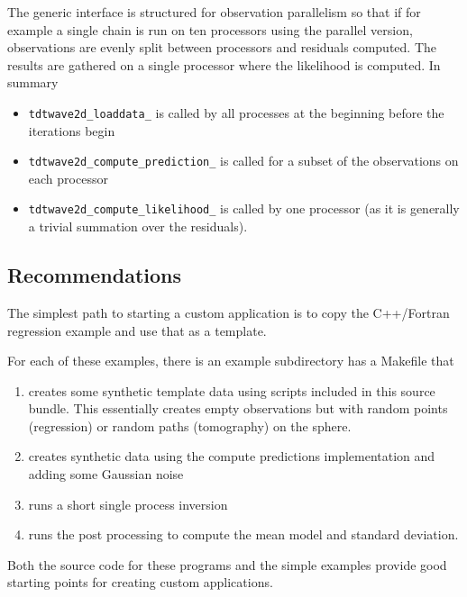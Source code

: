 \documentclass[a4paper,12pt]{article}
\begin{document}
The generic interface is structured for observation parallelism so that if for example
a single chain is run on ten processors using the parallel version, observations are
evenly split between processors and residuals computed. The results are gathered on
a single processor where the likelihood is computed. In summary

\begin{itemize}
\item {\tt tdtwave2d\_loaddata\_} is called by all processes at the beginning before
  the iterations begin
\item {\tt tdtwave2d\_compute\_prediction\_} is called for a subset of the observations
  on each processor
\item {\tt tdtwave2d\_compute\_likelihood\_} is called by one processor (as it is
  generally a trivial summation over the residuals).
\end{itemize}

\subsection{Recommendations}

The simplest path to starting a custom application is to copy 
the C++/Fortran regression example and use that as
a template.

For each of these examples, there is an example subdirectory
has a Makefile that

\begin{enumerate}
\item creates some synthetic template data using scripts included in this source
  bundle. This essentially creates empty observations but with random points (regression) or
  random paths (tomography) on the sphere.
\item creates synthetic data using the compute predictions implementation and adding
  some Gaussian noise
\item runs a short single process inversion
\item runs the post processing to compute the mean model and standard deviation.
\end{enumerate}

Both the source code for these programs and the simple examples provide good
starting points for creating custom applications.




\end{document}
